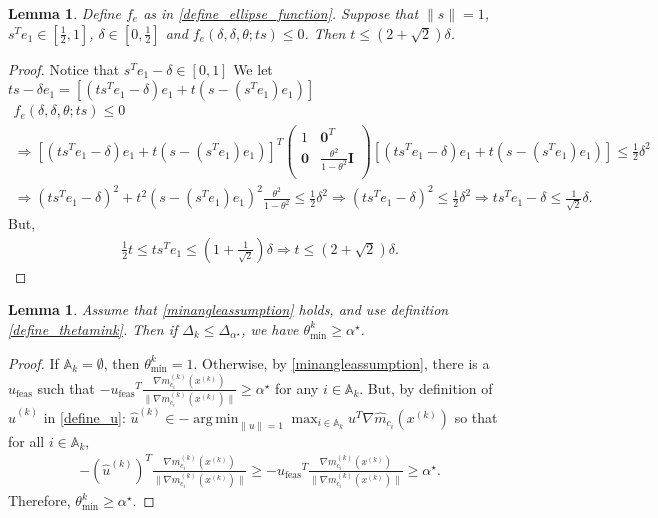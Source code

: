 \documentclass{article}
\newtheorem{lemma}[theorem]{Lemma}
\theoremstyle{case}
\DeclareMathOperator*{\argmin}{arg\,min}
\newcommand{\activeconstraintsk}{{\mathbb A_{k}}}
\newcommand{\dk}{\Delta_k}
\newcommand{\gmcik}{{\nabla m_{c_i}^{(k)}\left(\xk\right)}}
\newcommand{\hgmcik}{{\nabla \hat m_{c_i}(\xk)}}
\newcommand{\huk}{{{\hat u}^{(k)}}}
\newcommand{\minanglealpha}{{ \alpha^{\star} }}
\newcommand{\minangledelta}{{\Delta_{\alpha^{\star}}}}
\newcommand{\minangleu}{{u_{\textrm{feas}}}}
\newcommand{\thetamink}{{\theta^k_{\text{min}}}}
\newcommand{\xk}{{x^{(k)}}}
\begin{document}
\begin{lemma}
\label{ellipse_fits_part_2}
Define $f_e$ as in \cref{define_ellipse_function}.
Suppose that $\|s\| = 1$, $s^Te_1 \in \left[\frac 1 2, 1\right]$, $\delta \in [0, \frac 1 2]$ and $f_e(\delta, \delta, \theta; ts) \le 0$.
Then $t \le \left(2 + \sqrt{2}\right) \delta$.
\end{lemma}
\begin{proof}
Notice that $s^Te_1 - \delta \in \left[0, 1\right]$
We let $ts - \delta e_1= \left[\left(ts^Te_1 - \delta\right) e_1 + t\left(s - \left(s^Te_1\right) e_1\right)\right]$
\begin{align*}
f_e(\delta, \delta, \theta; ts) \le 0 \\
\Longrightarrow 
\left[\left(ts^Te_1 - \delta\right) e_1 + t\left(s - \left(s^Te_1\right) e_1\right)\right]^T\begin{pmatrix}
1 & \boldsymbol0^T \\
\boldsymbol 0 & \frac{\theta^2}{1 - \theta^2} \boldsymbol I \\
\end{pmatrix}\left[\left(ts^Te_1 - \delta\right) e_1 + t\left(s - \left(s^Te_1\right) e_1\right)\right] \le \frac 1 2 \delta^2 \\
\Longrightarrow
\left(ts^Te_1 - \delta\right)^2 + t^2\left(s - \left(s^Te_1\right) e_1\right)^2  \frac{\theta^2}{1 - \theta^2} \le \frac 1 2 \delta^2
\Longrightarrow 
\left(t s^Te_1 - \delta\right)^2 \le \frac 1 2 \delta^2 
\Longrightarrow t s^Te_1 - \delta \le \frac 1 {\sqrt{2}} \delta.
\end{align*}
But,
\begin{align*}
\frac 1 2 t \le t s^Te_1 \le \left(1 + \frac 1 {\sqrt{2}}\right) \delta
\Longrightarrow t \le \left(2 + \sqrt{2}\right) \delta.
\end{align*}
\end{proof}

\begin{lemma}
\label{theta_min_is_bounded}
Assume that \cref{minangleassumption} holds,
and use definition \cref{define_thetamink}.
Then if $\dk \le \minangledelta$, we have $\thetamink \ge \minanglealpha$.
\end{lemma}

\begin{proof}
If $\activeconstraintsk = \emptyset$, then $\thetamink = 1$.
Otherwise, by \cref{minangleassumption}, there is a $\minangleu$ such that 
$-\minangleu^T\frac{\gmcik}{\|\gmcik\|} \ge \minanglealpha$ for any $i \in \activeconstraintsk$.
But, by definition of $\huk$ in \cref{define_u}:
$\huk \in -\argmin_{\|u\| = 1} \max_{i \in \activeconstraintsk} u^T\hgmcik$
so that for all $i \in \activeconstraintsk$,
\begin{align*}
-\left(\huk\right)^T\frac{\gmcik}{\|\gmcik\|}  \ge -\minangleu^T\frac{\gmcik}{\|\gmcik\|} \ge \minanglealpha.
\end{align*}
Therefore, $\thetamink \ge \minanglealpha$.
\end{proof}
\end{document}
